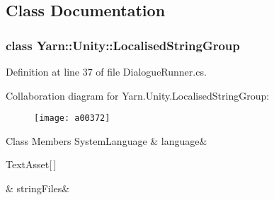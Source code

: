 \subsection{Class Documentation}
\label{a00366}
\hypertarget{a00129_a00366}{}
\subsubsection{class Yarn\-:\-:Unity\-:\-:Localised\-String\-Group}


Definition at line 37 of file Dialogue\-Runner.\-cs.



Collaboration diagram for Yarn.\-Unity.\-Localised\-String\-Group\-:
\nopagebreak
\begin{figure}[H]
\begin{center}
\leavevmode
\texttt{[image: a00372]}
\end{center}
\end{figure}
\begin{DoxyFields}{Class Members}
\hypertarget{a00129_a395d808fa32cb4fe68a62d7852534e1a}{System\-Language}\label{a00129_a395d808fa32cb4fe68a62d7852534e1a}
&
language&
\\
\hline

\hypertarget{a00129_a636624112fd57fedda96d485d20e6b9e}{Text\-Asset\mbox{[}$\,$\mbox{]}}\label{a00129_a636624112fd57fedda96d485d20e6b9e}
&
string\-Files&
\\
\hline

\end{DoxyFields}
